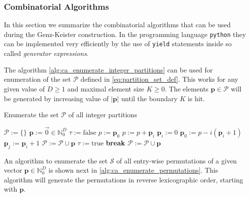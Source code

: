 \documentclass[a4paper,10pt]{article}
\begin{document}
\subsubsection{Combinatorial Algorithms}


In this section we summarize the combinatorial algorithms that
can be used during the Genz-Keister construction. In the programming
language \texttt{python} they can be implemented very efficiently by
the use of \texttt{yield} statements inside so called \emph{generator expressions}.

The algorithm \eqref{alg:ca_enumerate_integer_partitions} can
be used for enumeration of the set $\mathcal{P}$ defined in
\eqref{eq:partition_set_def}. This works for any given value
of $D \geq 1$ and maximal element size $K \geq 0$. The elements
$\mathbf{p} \in \mathcal{P}$ will be generated by increasing value
of $|\mathbf{p}|$ until the boundary $K$ is hit.


\begin{algorithm}[h!]
  \caption{Enumerate the set $\mathcal{P}$ of all integer partitions}
  \label{alg:ca_enumerate_integer_partitions}
  \begin{algorithmic}
      \State $\mathcal{P} := \{\}$
      \State $\mathbf{p} := \vec{0} \in \mathbb{N}_{0}^{D}$
        \State $\tau := \mathrm{false}$
        \State $p := \mathbf{p}_{0}$
          \State $p := p + \mathbf{p}_i$
            \State $\mathbf{p}_{i} := 0$
          \Else
            \State $\mathbf{p}_{0} := p - i (\mathbf{p}_{i} + 1)$
              \State $\mathbf{p}_{j} := \mathbf{p}_{i} + 1$
            \EndFor
            \State $\mathcal{P} := \mathcal{P} \cup \mathbf{p}$
            \State $\tau := \mathrm{true}$
            \State \bf{break}
          \EndIf
        \EndFor
            \State $\mathcal{P} := \mathcal{P} \cup \mathbf{p}$
          \EndIf
        \EndIf
      \EndWhile
    \EndProcedure
  \end{algorithmic}
\end{algorithm}

An algorithm to enumerate the set $\mathcal{S}$ of all entry-wise
permutations of a given vector $\mathbf{p} \in \mathbb{N}_{0}^{D}$
is shown next in \eqref{alg:ca_enumerate_permutations}. This algorithm
will generate the permutations in reverse lexicographic order,
starting with $\mathbf{p}$.
\end{document}
